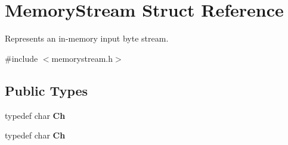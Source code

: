 \hypertarget{struct_memory_stream}{}\section{Memory\+Stream Struct Reference}
\label{struct_memory_stream}


Represents an in-\/memory input byte stream.  




{\ttfamily \#include $<$memorystream.\+h$>$}

\subsection*{Public Types}
\begin{DoxyCompactItemize}
\item 
typedef char {\bfseries Ch}\hypertarget{struct_memory_stream_a62a1cbd052c325c83dbdb387d2f89088}{}\label{struct_memory_stream_a62a1cbd052c325c83dbdb387d2f89088}

\item 
typedef char {\bfseries Ch}\hypertarget{struct_memory_stream_a62a1cbd052c325c83dbdb387d2f89088}{}\label{struct_memory_stream_a62a1cbd052c325c83dbdb387d2f89088}

\end{DoxyCompactItemize}
